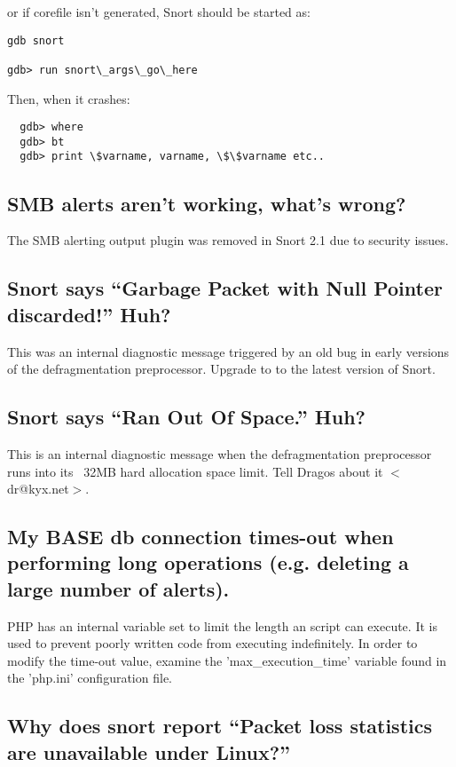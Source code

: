 \documentclass{article}
\begin{document}
or if corefile isn't generated, Snort should be started as:

\begin{verbatim}
gdb snort

gdb> run snort\_args\_go\_here
\end{verbatim}

Then, when it crashes:
\begin{verbatim}
  gdb> where
  gdb> bt
  gdb> print \$varname, varname, \$\$varname etc..
\end{verbatim}

\subsection{SMB alerts aren't working, what's wrong? }

The SMB alerting output plugin was removed in Snort 2.1 due to security issues.
 
\subsection{Snort says ``Garbage Packet with Null Pointer discarded!'' Huh?}

 This was an internal diagnostic message triggered by an old bug
in early versions of the defragmentation preprocessor.  Upgrade to 
to the latest version of Snort.

\subsection{Snort says ``Ran Out Of Space.'' Huh?}

This is an internal diagnostic message when the defragmentation
preprocessor runs into its ~32MB hard allocation space limit.
Tell Dragos about it $<$dr@kyx.net$>$.

\subsection{My BASE db connection times-out when performing long operations (e.g.
deleting a large number of alerts).}

PHP has an internal variable set to limit the length an script can execute. It
is used to prevent poorly written code from executing indefinitely. In order to
modify the time-out value, examine the 'max\_execution\_time' variable found in
the 'php.ini' configuration file.

\subsection{Why does snort report ``Packet loss statistics are unavailable under Linux?''}
\end{document}
